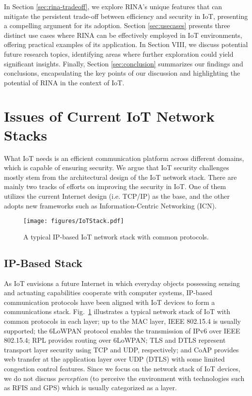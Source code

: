 \documentclass{ieeeaccess}
\begin{document}
In Section \ref{sec:rina-tradeoff}, we explore RINA’s unique features that can mitigate the persistent trade-off between efficiency and security in IoT, presenting a compelling argument for its adoption. Section \ref{sec:usecases} presents three distinct use cases where RINA can be effectively employed in IoT environments, offering practical examples of its application. In Section VIII, we discuss potential future research topics, identifying areas where further exploration could yield significant insights. Finally, Section \ref{sec:conclusion} summarizes our findings and conclusions, encapsulating the key points of our discussion and highlighting the potential of RINA in the context of IoT.


\section{Issues of Current IoT Network Stacks} \label{sec:iot}
What IoT needs is an efficient communication platform across different domains, which is capable of ensuring security. We argue that IoT security challenges mostly stem from the architectural design of the IoT network stack. There are mainly two tracks of efforts on improving the security in IoT. One of them utilizes the current Internet design (i.e. TCP/IP) as the base, and the other adopts new frameworks such as Information-Centric Networking (ICN).  



\begin{figure} 
	\centering
	\texttt{[image: figures/IoTStack.pdf]}
	\caption{A typical IP-based IoT network stack with common protocols.}
	\label{fig:IoTStack}
\end{figure}


\subsection{IP-Based Stack}
As IoT envisions a future Internet in which everyday objects possessing sensing and actuating capabilities cooperate with computer systems, IP-based communication protocols have been aligned with IoT devices to form a communications stack. 
Fig.~\ref{fig:IoTStack} illustrates a typical network stack of IoT with common protocols in each layer; up to the MAC layer, IEEE 802.15.4 \cite{6012487} is usually supported; the 6LoWPAN protocol \cite{rfc4919} enables the transmission of IPv6 over IEEE 802.15.4; RPL \cite{rfc6282} provides routing over 6LoWPAN; TLS \cite{rfc5246} and DTLS \cite{rfc6347} represent transport layer security using TCP and UDP, respectively; and CoAP \cite{rfc7252} provides web transfer at the application layer over UDP (DTLS) with some limited congestion control features. Since we focus on the network stack of IoT devices, we do not discuss \textit{perception} (to perceive the environment with technologies such as RFIS and GPS) which is usually categorized as a layer.
\end{document}
